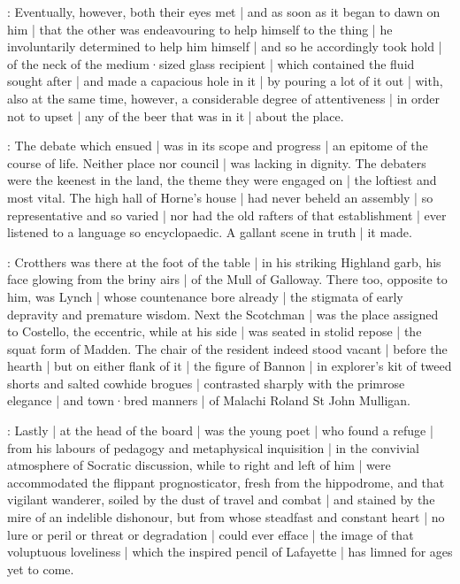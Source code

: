 :
Eventually,
however,
both their eyes met |
and as soon as it began to dawn on him |
that the other was endeavouring to help himself to the thing |
he involuntarily determined to help him himself |
and so he accordingly took hold |
of the neck of the medium·sized glass recipient |
which contained the fluid sought after |
and made a capacious hole in it |
by pouring a lot of it out |
with,
also at the same time,
however,
a considerable degree of attentiveness |
in order not to upset |
any of the beer that was in it |
about the place.



:
The debate which ensued |
was in its scope and progress |
an epitome of the course of life.
Neither place nor council |
was lacking in dignity.
The debaters were the keenest in the land,
the theme they were engaged on |
the loftiest and most vital.
The high hall of Horne's house |
had never beheld an assembly |
so representative and so varied |
nor had the old rafters of that establishment |
ever listened to a language so encyclopaedic.
A gallant scene in truth |
it made.

:
Crotthers was there at the foot of the table |
in his striking Highland garb,
his face glowing from the briny airs |
of the Mull of Galloway.
There too,
opposite to him,
was Lynch |
whose countenance bore already |
the stigmata of early depravity and premature wisdom.
Next the Scotchman |
was the place assigned to Costello,
the eccentric,
while at his side |
was seated in stolid repose |
the squat form of Madden.
The chair of the resident indeed stood vacant |
before the hearth |
but on either flank of it |
the figure of Bannon |
in explorer's kit of tweed shorts and salted cowhide brogues |
contrasted sharply with the primrose elegance |
and town·bred manners |
of Malachi Roland St John Mulligan.

:
Lastly |
at the head of the board |
was the young poet |
who found a refuge |
from his labours of pedagogy and metaphysical inquisition |
in the convivial atmosphere of Socratic discussion,
while to right and left of him |
were accommodated the flippant prognosticator,
fresh from the hippodrome,
and that vigilant wanderer,
soiled by the dust of travel and combat |
and stained by the mire of an indelible dishonour,
but from whose steadfast and constant heart |
no lure or peril or threat or degradation |
could ever efface |
the image of that voluptuous loveliness |
which the inspired pencil of Lafayette |
has limned for ages yet to come.

